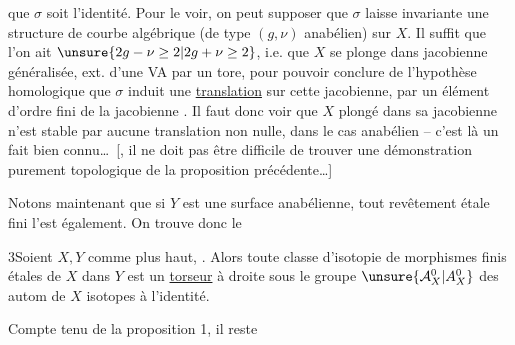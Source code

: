 que $\sigma$ soit l'identité. Pour le voir, on peut supposer que $\sigma$ laisse invariante une structure  de courbe algébrique (de type $(g,\nu)$ anabélien) sur $X$. Il suffit  que l'on ait $\unsure{2g-\nu\geq2|2g+\nu\geq2}$, i.e. que $X$ se plonge dans  jacobienne généralisée, ext. d'une VA par un tore, pour pouvoir conclure de l'hypothèse homologique que $\sigma$  induit une \uline{translation} sur cette jacobienne, par un élément d'ordre fini de la jacobienne . Il faut donc voir que $X$ plongé dans sa jacobienne n'est stable par aucune  translation non nulle, dans le cas anabélien -- c'est là un fait bien connu\ldots\ [, il ne doit pas être difficile de trouver une démonstration purement topologique de la proposition précédente\ldots]

Notons maintenant que si $Y$ est une surface  anabélienne, tout revêtement étale fini l'est également. On trouve donc le

  3\quad Soient $X,Y$  comme plus haut, .
Alors toute classe d'isotopie de morphismes finis étales de $X$ dans $Y$ est un \uline{torseur} à droite sous le groupe $\unsure{\mathcal{A}_X^0|A_X^0}$ des autom de $X$ isotopes à l'identité.

Compte tenu de la proposition 1, il reste
